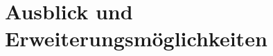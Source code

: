 \documentclass[]{article}
\begin{document}
	\section{Ausblick und Erweiterungsmöglichkeiten}
		
		

\printbibliography
\end{document}
